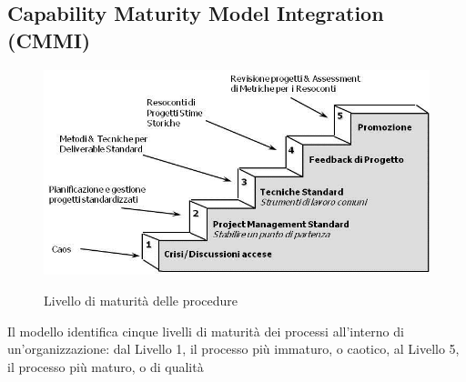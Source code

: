 \subsection{Capability Maturity Model Integration (CMMI)}
\begin{figure} [H]
\centering
     \includegraphics[scale=0.8]{../modello/img/CMMI}\\
     \caption{Livello di maturità delle procedure}\label{fig:2}
\end{figure}
Il modello identifica cinque livelli di maturità dei processi all'interno di un'organizzazione: dal Livello 1, il processo più immaturo, o caotico, al Livello 5, il processo più maturo, o di qualità
